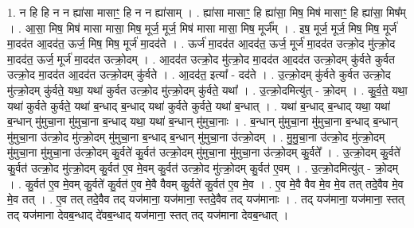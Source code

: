 \documentclass[17pt]{extarticle}
\begin{document}
1. न हि हि न न ह्या॑सा मासाꣳ॒॒ हि न न ह्या॑साम् । . ह्या॑सा मासाꣳ॒॒ हि ह्या॑सा॒ मिष॒ मिष॑ मासाꣳ॒॒ हि ह्या॑सा॒ मिष᳚म् । . आ॒सा॒ मिष॒ मिष॑ मासा मासा॒ मिष॒ मूर्ज॒ मूर्ज॒ मिष॑ मासा मासा॒ मिष॒ मूर्ज᳚म् । . इष॒ मूर्ज॒ मूर्ज॒ मिष॒ मिष॒ मूर्ज॑ मा॒दद॑त आ॒दद॑त॒ ऊर्ज॒ मिष॒ मिष॒ मूर्ज॑ मा॒दद॑ते । . ऊर्ज॑ मा॒दद॑त आ॒दद॑त॒ ऊर्ज॒ मूर्ज॑ मा॒दद॑त उत्क्रो॒द मु॑त्क्रो॒द मा॒दद॑त॒ ऊर्ज॒ मूर्ज॑ मा॒दद॑त उत्क्रो॒दम् । . आ॒दद॑त उत्क्रो॒द मु॑त्क्रो॒द मा॒दद॑त आ॒दद॑त उत्क्रो॒दम् कु॑र्वते कुर्वत उत्क्रो॒द मा॒दद॑त आ॒दद॑त उत्क्रो॒दम् कु॑र्वते । . आ॒दद॑त॒ इत्या᳚ - दद॑ते । . उ॒त्क्रो॒दम् कु॑र्वते कुर्वत उत्क्रो॒द मु॑त्क्रो॒दम् कु॑र्वते॒ यथा॒ यथा॑ कुर्वत उत्क्रो॒द मु॑त्क्रो॒दम् कु॑र्वते॒ यथा᳚ । . उ॒त्क्रो॒दमित्यु॑त् - क्रो॒दम् । . कु॒र्व॒ते॒ यथा॒ यथा॑ कुर्वते कुर्वते॒ यथा॑ ब॒न्धाद् ब॒न्धाद् यथा॑ कुर्वते कुर्वते॒ यथा॑ ब॒न्धात् । . यथा॑ ब॒न्धाद् ब॒न्धाद् यथा॒ यथा॑ ब॒न्धान् मु॑मुचा॒ना मु॑मुचा॒ना ब॒न्धाद् यथा॒ यथा॑ ब॒न्धान् मु॑मुचा॒नाः । . ब॒न्धान् मु॑मुचा॒ना मु॑मुचा॒ना ब॒न्धाद् ब॒न्धान् मु॑मुचा॒ना उ॑त्क्रो॒द मु॑त्क्रो॒दम् मु॑मुचा॒ना ब॒न्धाद् ब॒न्धान् मु॑मुचा॒ना उ॑त्क्रो॒दम् । . मु॒मु॒चा॒ना उ॑त्क्रो॒द मु॑त्क्रो॒दम् मु॑मुचा॒ना मु॑मुचा॒ना उ॑त्क्रो॒दम् कु॒र्वते॑ कु॒र्वत॑ उत्क्रो॒दम् मु॑मुचा॒ना मु॑मुचा॒ना उ॑त्क्रो॒दम् कु॒र्वते᳚ । . उ॒त्क्रो॒दम् कु॒र्वते॑ कु॒र्वत॑ उत्क्रो॒द मु॑त्क्रो॒दम् कु॒र्वत॑ ए॒व मे॒वम् कु॒र्वत॑ उत्क्रो॒द मु॑त्क्रो॒दम् कु॒र्वत॑ ए॒वम् । . उ॒त्क्रो॒दमित्यु॑त् - क्रो॒दम् । . कु॒र्वत॑ ए॒व मे॒वम् कु॒र्वते॑ कु॒र्वत॑ ए॒व मे॒वै वैवम् कु॒र्वते॑ कु॒र्वत॑ ए॒व मे॒व । . ए॒व मे॒वै वैव मे॒व मे॒व तत् तदे॒वैव मे॒व मे॒व तत् । . ए॒व तत् तदे॒वैव तद् यज॑माना॒ यज॑माना॒ स्तदे॒वैव तद् यज॑मानाः । . तद् यज॑माना॒ यज॑माना॒ स्तत् तद् यज॑माना देवब॒न्धाद् दे॑वब॒न्धाद् यज॑माना॒ स्तत् तद् यज॑माना देवब॒न्धात् । \newline
\end{document}
